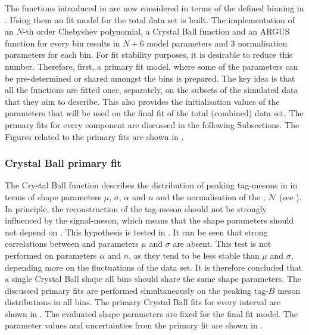 The functions introduced in  are now considered in terms of the defined binning in .
Using them an \Mbc fit model for the total data set is built.
The implementation of an $N$-th order Chebyshev polynomial, a Crystal Ball function and an ARGUS function for every \EB bin results
in $N+6$ model parameters and 3 normalisation parameters for each bin.
For fit stability purposes, it is desirable to reduce this number.
Therefore, first, a primary fit model, where some of the parameters can be pre-determined or shared amongst the bins is prepared.
The key idea is that all the functions are fitted once, separately, on the subsets of the simulated data that they aim to describe.
This also provides the initialisation values of the parameters that will be used on the final fit of the total (combined) data set.
The primary fits for every component are discussed in the following Subsections.
The Figures related to the primary fits are shown in .

\subsubsection{Crystal Ball primary fit}\label{sec:crystal_ball_prefit}

The Crystal Ball function describes the distribution of peaking tag-\B mesons in \Mbc in terms of shape parameters $\mu$, $\sigma$, $\alpha$ and $n$ and the normalisation of the \PDF, $\mathcal{N}$ (see ).
In principle, the reconstruction of the tag-\B meson should not be strongly influenced by the signal-\B meson, which means that the shape parameters should not depend on \EB.
This hypothesis is tested in .
It can be seen that strong correlations between \EB and parameters $\mu$ and $\sigma$ are absent.
This test is not performed on parameters $\alpha$ and $n$, as they tend to be less stable than $\mu$ and $\sigma$, depending more on the fluctuations of the data set.
It is therefore concluded that a single Crystal Ball shape all \EB bins should share the same shape parameters.
The discussed primary fits are performed simultaneously on the peaking tag-$B$ meson \Mbc distributions in all \EB bins.
The primary Crystal Ball fits for every \EB interval are shown in .
The evaluated shape parameters are fixed for the final \Mbc fit model.
The parameter values and uncertainties from the primary fit are shown in .


